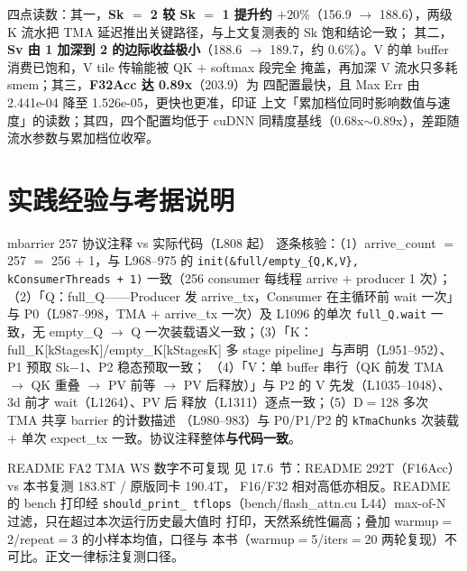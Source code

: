 四点读数：其一，\textbf{Sk $=$ 2 较 Sk $=$ 1 提升约 $+20\%$}（156.9 $\to$
188.6），两级 K 流水把 TMA 延迟推出关键路径，与上文复测表的 Sk 饱和结论一致；
其二，\textbf{Sv 由 1 加深到 2 的边际收益极小}（188.6 $\to$ 189.7，约
$0.6\%$）。V 的单 buffer 消费已饱和，V tile 传输能被 QK $+$ softmax 段完全
掩盖，再加深 V 流水只多耗 smem；其三，\textbf{F32Acc 达 0.89x}（203.9）为
四配置最快，且 Max Err 由 2.441e-04 降至 1.526e-05，更快也更准，印证
上文「累加档位同时影响数值与速度」的读数；其四，四个配置均低于 cuDNN
同精度基线（0.68x$\sim$0.89x），差距随流水参数与累加档位收窄。

\section{实践经验与考据说明}

\begin{kaogu}[F2/F3 核校通过]{mbarrier 257 协议注释 vs 实际代码（L808 起）}
  逐条核验：（1）arrive\_count $=$ 257 $=$ 256 $+$ 1，与 L968--975 的
  \texttt{init\allowbreak{}(\&full/\allowbreak{}empty\_\allowbreak{}\{Q,\allowbreak{}K,\allowbreak{}V\},\allowbreak{} k\allowbreak{}Consumer\allowbreak{}Threads + 1)} 一致（256
  consumer 每线程 arrive $+$ producer 1 次）；（2）「Q：full\_Q——Producer
  发 arrive\_tx，Consumer 在主循环前 wait 一次」与 P0（L987--998，TMA $+$
  arrive\_tx 一次）及 L1096 的单次 \texttt{full\_Q.wait} 一致，无 empty\_Q
  $\to$ Q 一次装载语义一致；（3）「K：full\_K[kStagesK]/empty\_K[kStagesK]
  多 stage pipeline」与声明（L951--952）、P1 预取 Sk$-$1、P2 稳态预取一致；
  （4）「V：单 buffer 串行（QK 前发 TMA $\to$ QK 重叠 $\to$ PV 前等 $\to$
  PV 后释放）」与 P2 的 V 先发（L1035--1048）、3d 前才 wait（L1264）、PV 后
  释放（L1311）逐点一致；（5）D$=$128 多次 TMA 共享 barrier 的计数描述
  （L980--983）与 P0/P1/P2 的 \texttt{kTmaChunks} 次装载 $+$ 单次
  expect\_tx 一致。协议注释整体\textbf{与代码一致}。
\end{kaogu}

\begin{kaogu}[F4·口径差异]{README FA2 TMA WS 数字不可复现}
  见 17.6~节：README 292T（F16Acc）vs 本书复测 183.8T / 原版同卡 190.4T，
  F16/F32 相对高低亦相反。README 的 bench 打印经 \texttt{should\_\allowbreak{}print\_\allowbreak{}
  tflops}（bench/flash\_attn.cu L44）max-of-N 过滤，只在超过本次运行历史最大值时
  打印，天然系统性偏高；叠加 warmup$=$2/repeat$=$3 的小样本均值，口径与
  本书（warmup$=$5/iters$=$20 两轮复现）不可比。正文一律标注复测口径。
\end{kaogu}

